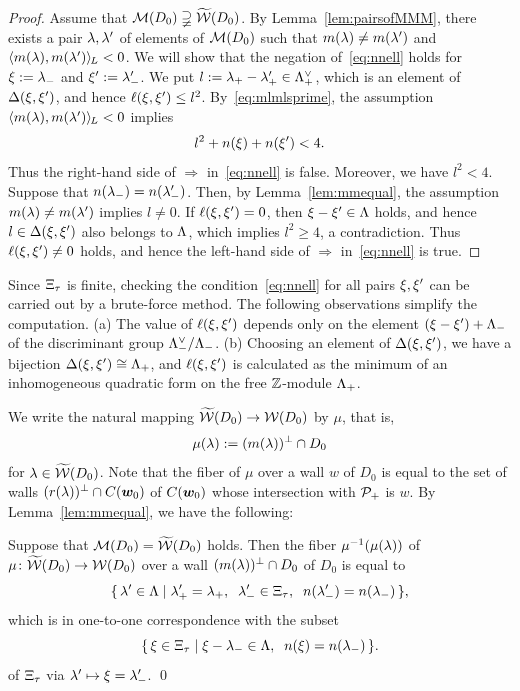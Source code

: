 \documentclass{amsart} %
\begin{document}
%
\begin{proof}
Assume that $\mathord{\mathcal{M}}(D_0)\supsetneqq\widetilde{\mathord{\mathcal{W}}} (D_0)$.
By Lemma~\ref{lem:pairsofMMM},
there exists a pair $\lambda, \lambda^{\prime}$ of elements of $ \mathord{\mathcal{M}}(D_0)$
such that $m(\lambda)\ne m(\lambda^{\prime})$ and $ \langle m(\lambda), m(\lambda^{\prime}) \rangle_{\hskip -1pt L} <0$.
We will show that the negation of~\eqref{eq:nnell} holds for
$\xi:={\lambda}_{-}$ and $\xi^{\prime}:={\lambda}_{-}^{\prime}$.
We put $l:={\lambda}_{+}-{\lambda}_{+}^{\prime}\in \Lambda_{+}^{\vee}$,
which is an element of $\Delta(\xi, \xi^{\prime})$,
and hence $\ell(\xi, \xi^{\prime})\le l^2$.
By~\eqref{eq:mlmlsprime},
the assumption $ \langle m(\lambda), m(\lambda^{\prime}) \rangle_{\hskip -1pt L} <0$ implies 
%
\begin{equation*}\label{eq:lnn}
l^2+n(\xi)+n(\xi^{\prime})<4.
\end{equation*}
%
Thus the right-hand side of $\Longrightarrow$ in~\eqref{eq:nnell} is false.
Moreover, we have $l^2<4$.
Suppose that $n({\lambda}_{-})=n({\lambda}_{-}^{\prime})$.
Then, by Lemma~\ref{lem:mmequal},
the assumption $m(\lambda)\ne m(\lambda^{\prime})$ implies $l\ne 0$.
If $\ell(\xi, \xi^{\prime})= 0$, then 
$\xi-\xi^{\prime}\in \Lambda$ holds, and hence 
$l\in \Delta(\xi, \xi^{\prime})$ also belongs to $\Lambda$,
which implies $l^2\ge 4$, a contradiction.
Thus $\ell(\xi, \xi^{\prime})\ne0$ holds, and hence the left-hand side of $\Longrightarrow$ in~\eqref{eq:nnell} is true.
\end{proof}
%
\begin{remark}\label{rem:MMMtilwalls}
Since $\Xi_{\tau}$ is finite,
checking the condition~\eqref{eq:nnell} for all pairs $\xi, \xi^{\prime}$
 can be carried out by a brute-force method.
The following observations simplify the computation.
(a) 
The value of $\ell(\xi, \xi^{\prime})$ depends only on the element $(\xi-\xi^{\prime})+\Lambda_{-}$
of the discriminant group $\Lambda_{-}^{\vee}/\Lambda_{-}$.
(b) 
Choosing an element of $\Delta(\xi, \xi^{\prime})$, 
we have a bijection $\Delta(\xi, \xi^{\prime})\cong \Lambda_{+}$,
and $\ell(\xi, \xi^{\prime})$ is calculated as the minimum of
an inhomogeneous quadratic form on the free $\mathord{\mathbb{Z}}$-module $\Lambda_{+}$.
\end{remark}
%
We write the natural mapping
$\widetilde{\mathord{\mathcal{W}}}(D_0)\to \mathord{\mathcal{W}}(D_0)$
by $\mu$, that is, 
\[
\mu(\lambda):=(m(\lambda))^{\perp}\cap D_0
\]
for $\lambda\in \widetilde{\mathord{\mathcal{W}}}(D_0)$.
Note that the fiber of $\mu$ over a wall $w$
of $D_0$ is equal to the set of walls $(r(\lambda))^{\perp}\cap \mathord{C}(\boldsymbol{w}_0)$
of $\mathord{C}(\boldsymbol{w}_0)$ whose intersection with $\mathord{\mathcal{P}}_{+}$ is $w$.
By Lemma~\ref{lem:mmequal}, we have the following:
%
\begin{lemma}\label{lem:wallfiber}
Suppose that $\mathord{\mathcal{M}}(D_0)=\widetilde{\mathord{\mathcal{W}}} (D_0)$ holds.
Then the fiber $\mu^{-1}(\mu(\lambda))$ of %
$\mu\colon \widetilde{\mathord{\mathcal{W}}}(D_0)\to \mathord{\mathcal{W}}(D_0)$
over a wall $(m(\lambda))^{\perp}\cap D_0$ of $D_0$
is equal to
\[
\set{\lambda\sprime\in \Leech}%
{\lambdaplus\sprime=\lambdaplus, \;\; \lambdaminus\sprime\in \Xitau, \;\; n(\lambdaminus\sprime)=n(\lambdaminus)},
\]
which is in one-to-one correspondence with the subset 
\[
\{\,{\xi\in \Xi_{\tau}}\mid {\xi-{\lambda}_{-}\in \Lambda, \;\; n(\xi)=n({\lambda}_{-})} \,\}.
\]
of $\Xi_{\tau}$ via $\lambda^{\prime} \mapsto \xi={\lambda}_{-}^{\prime}$.
\qed
\end{lemma}
\end{document}
